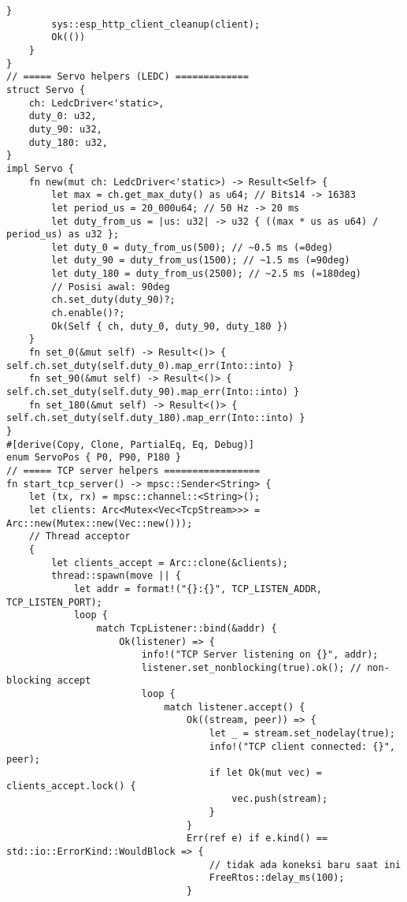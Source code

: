 \documentclass[a4paper, 12pt]{article}
\begin{document}
\begin{lstlisting}[style=ruststyle, caption={main.rs}, basicstyle=\ttfamily\tiny]
        }
        sys::esp_http_client_cleanup(client);
        Ok(())
    }
}
// ===== Servo helpers (LEDC) =============
struct Servo {
    ch: LedcDriver<'static>,
    duty_0: u32,
    duty_90: u32,
    duty_180: u32,
}
impl Servo {
    fn new(mut ch: LedcDriver<'static>) -> Result<Self> {
        let max = ch.get_max_duty() as u64; // Bits14 -> 16383
        let period_us = 20_000u64; // 50 Hz -> 20 ms
        let duty_from_us = |us: u32| -> u32 { ((max * us as u64) / period_us) as u32 };
        let duty_0 = duty_from_us(500); // ~0.5 ms (=0deg)
        let duty_90 = duty_from_us(1500); // ~1.5 ms (=90deg)
        let duty_180 = duty_from_us(2500); // ~2.5 ms (=180deg)
        // Posisi awal: 90deg
        ch.set_duty(duty_90)?;
        ch.enable()?;
        Ok(Self { ch, duty_0, duty_90, duty_180 })
    }
    fn set_0(&mut self) -> Result<()> { self.ch.set_duty(self.duty_0).map_err(Into::into) }
    fn set_90(&mut self) -> Result<()> { self.ch.set_duty(self.duty_90).map_err(Into::into) }
    fn set_180(&mut self) -> Result<()> { self.ch.set_duty(self.duty_180).map_err(Into::into) }
}
#[derive(Copy, Clone, PartialEq, Eq, Debug)]
enum ServoPos { P0, P90, P180 }
// ===== TCP server helpers =================
fn start_tcp_server() -> mpsc::Sender<String> {
    let (tx, rx) = mpsc::channel::<String>();
    let clients: Arc<Mutex<Vec<TcpStream>>> = Arc::new(Mutex::new(Vec::new()));
    // Thread acceptor
    {
        let clients_accept = Arc::clone(&clients);
        thread::spawn(move || {
            let addr = format!("{}:{}", TCP_LISTEN_ADDR, TCP_LISTEN_PORT);
            loop {
                match TcpListener::bind(&addr) {
                    Ok(listener) => {
                        info!("TCP Server listening on {}", addr);
                        listener.set_nonblocking(true).ok(); // non-blocking accept
                        loop {
                            match listener.accept() {
                                Ok((stream, peer)) => {
                                    let _ = stream.set_nodelay(true);
                                    info!("TCP client connected: {}", peer);
                                    if let Ok(mut vec) = clients_accept.lock() {
                                        vec.push(stream);
                                    }
                                }
                                Err(ref e) if e.kind() == std::io::ErrorKind::WouldBlock => {
                                    // tidak ada koneksi baru saat ini
                                    FreeRtos::delay_ms(100);
                                }

\end{lstlisting}
\end{document}
